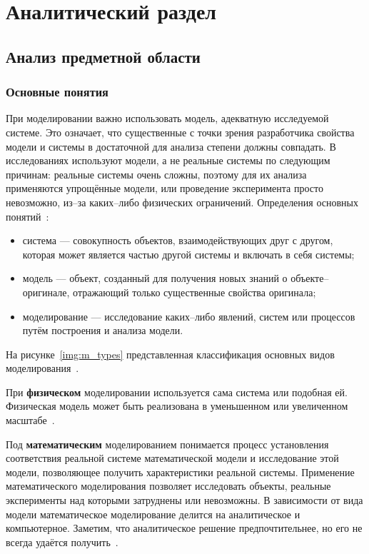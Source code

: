 \chapter{Аналитический раздел}

\section{Анализ предметной области}

\subsection{Основные понятия}

При моделировании важно использовать модель, адекватную исследуемой системе. Это означает, что существенные с точки зрения разработчика свойства модели и системы в достаточной для анализа степени должны совпадать. В исследованиях используют модели, а не реальные системы по следующим причинам: реальные системы очень сложны, поэтому для их анализа применяются упрощённые модели, или проведение эксперимента просто невозможно, из--за каких--либо физических ограничений. Определения основных понятий~\cite{m_types}:
\begin{itemize}[label=---]
	\item система --- совокупность объектов, взаимодействующих друг с другом, которая может является частью другой системы и включать в себя системы;
	\item модель --- объект, созданный для получения новых знаний о объекте--оригинале, отражающий только существенные свойства оригинала;
	\item моделирование --- исследование каких--либо явлений, систем или процессов путём построения и анализа модели.
\end{itemize}

На рисунке~\ref{img:m_types} представленная классификация основных видов моделирования~\cite{m_types}.
\FloatBarrier

При \textbf{физическом} моделировании используется сама система или подобная ей. Физическая модель может быть реализована в уменьшенном или увеличенном масштабе~\cite{m_types}.

Под \textbf{математическим} моделированием понимается процесс установления соответствия реальной системе математической модели и исследование этой модели, позволяющее получить характеристики реальной системы. Применение математического моделирования позволяет исследовать объекты, реальные эксперименты над которыми затруднены или невозможны. В зависимости от вида модели математическое моделирование делится на аналитическое и компьютерное. Заметим, что аналитическое решение предпочтительнее, но его не всегда удаётся получить~\cite{m_types}.

